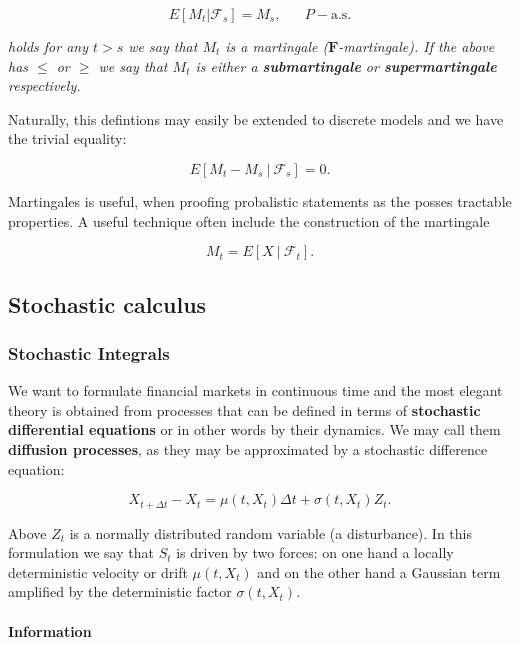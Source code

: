 \documentclass[
]{article}
\begin{document}
\[E[M_t\vert \mathcal{F}_s]=M_s,\hspace{20pt}P-\text{a.s.}\]

\emph{holds for any \(t>s\) we say that \(M_t\) is a martingale
(\(\mathbf{F}\)-martingale). If the above has \(\le\) or \(\ge\) we say
that \(M_t\) is either a \textbf{submartingale} or
\textbf{supermartingale} respectively.}

Naturally, this defintions may easily be extended to discrete models and
we have the trivial equality:

\[E[M_t-M_s\ \vert\ \mathcal{F}_s]=0.\]

Martingales is useful, when proofing probalistic statements as the
posses tractable properties. A useful technique often include the
construction of the martingale

\[M_t=E[X\ \vert\ \mathcal{F}_t].\]

\hypertarget{stochastic-calculus}{%
\subsection{Stochastic calculus}\label{stochastic-calculus}}

\hypertarget{stochastic-integrals}{%
\subsubsection{Stochastic Integrals}\label{stochastic-integrals}}

We want to formulate financial markets in continuous time and the most
elegant theory is obtained from processes that can be defined in terms
of \textbf{stochastic differential equations} or in other words by their
dynamics. We may call them \textbf{diffusion processes}, as they may be
approximated by a stochastic difference equation:

\[
X_{t+\Delta t}-X_t=\mu(t,X_t)\Delta t+\sigma(t,X_t)Z_t.\tag{4.1}
\]

Above \(Z_t\) is a normally distributed random variable (a disturbance).
In this formulation we say that \(S_t\) is driven by two forces: on one
hand a locally deterministic velocity or drift \(\mu(t,X_t)\) and on the
other hand a Gaussian term amplified by the deterministic factor
\(\sigma(t,X_t)\).

\hypertarget{information}{%
\paragraph{Information}\label{information}}
\end{document}
